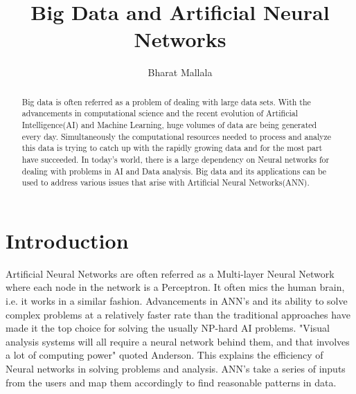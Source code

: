 \documentclass[sigconf]{acmart}
\begin{document}
\title{Big Data and Artificial Neural Networks}



\author{Bharat Mallala}




\begin{abstract}

Big data is often referred as a problem of dealing with large data sets. With the advancements in computational science and the recent evolution of Artificial Intelligence(AI) and Machine Learning, huge volumes of data are being generated every day. Simultaneously the computational resources needed to process and analyze this data is trying to catch up with the rapidly growing data and for the most part have succeeded. In today's world, there is a large dependency on Neural networks for dealing with problems in AI and Data analysis. Big data and its applications can be used to address various issues that arise with Artificial Neural Networks(ANN). 
\end{abstract}



\maketitle

\section{Introduction}

Artificial Neural Networks are often referred as a Multi-layer Neural Network where each node in the network is a Perceptron. It often mics the human brain, i.e. it works in a similar fashion. Advancements in ANN's and its ability to solve complex problems at a relatively faster rate than the traditional approaches have made it the top choice for solving the usually NP-hard AI problems. "Visual analysis systems will all require a neural network behind them, and that involves a lot of computing power"\cite{Anderson2017} quoted Anderson. This explains the efficiency of Neural networks in solving problems and analysis. ANN's take a series of inputs from the users and map them accordingly to find reasonable patterns in data.
\end{document}

